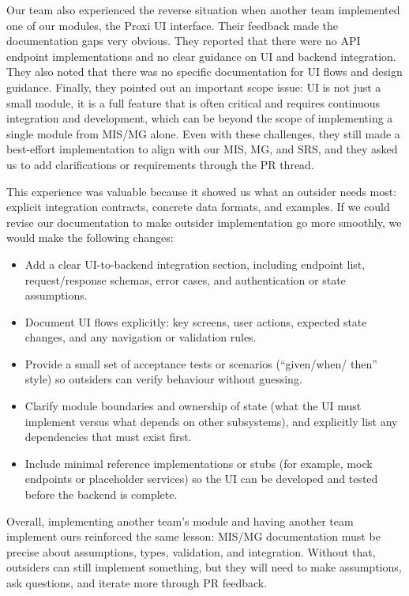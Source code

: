 \documentclass[12pt, titlepage]{article}
\begin{document}
\begin{enumerate}
Our team also experienced the reverse situation when another team
implemented one of our modules, the Proxi UI interface. Their feedback
made the documentation gaps very obvious. They reported that there were
no API endpoint implementations and no clear guidance on UI and backend
integration. They also noted that there was no specific documentation for
UI flows and design guidance. Finally, they pointed out an important scope
issue: UI is not just a small module, it is a full feature that is often
critical and requires continuous integration and development, which can be
beyond the scope of implementing a single module from MIS/MG alone. Even
with these challenges, they still made a best-effort implementation to
align with our MIS, MG, and SRS, and they asked us to add clarifications
or requirements through the PR thread.

This experience was valuable because it showed us what an outsider needs
most: explicit integration contracts, concrete data formats, and examples.
If we could revise our documentation to make outsider implementation go
more smoothly, we would make the following changes:
\begin{itemize}
  \item Add a clear UI-to-backend integration section, including endpoint
        list, request/response schemas, error cases, and authentication or
        state assumptions.
  \item Document UI flows explicitly: key screens, user actions, expected
        state changes, and any navigation or validation rules.
  \item Provide a small set of acceptance tests or scenarios (``given/when/
        then'' style) so outsiders can verify behaviour without guessing.
  \item Clarify module boundaries and ownership of state (what the UI must
        implement versus what depends on other subsystems), and explicitly
        list any dependencies that must exist first.
  \item Include minimal reference implementations or stubs (for example,
        mock endpoints or placeholder services) so the UI can be developed
        and tested before the backend is complete.
\end{itemize}

Overall, implementing another team's module and having another team
implement ours reinforced the same lesson: MIS/MG documentation must be
precise about assumptions, types, validation, and integration. Without
that, outsiders can still implement something, but they will need to make
assumptions, ask questions, and iterate more through PR feedback.



\end{enumerate}
\end{document}
